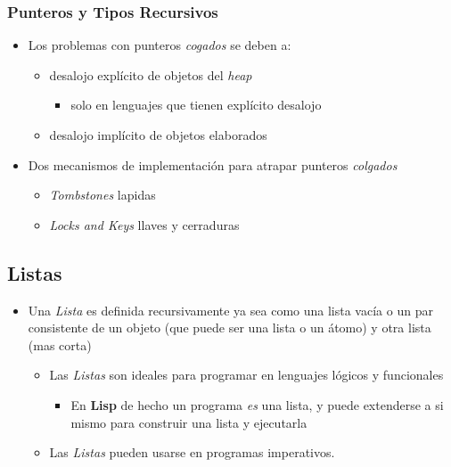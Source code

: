 \documentclass[11pt]{article}
\begin{document}
\subsubsection*{Punteros y Tipos Recursivos}
\label{sec:orgheadline45}
\begin{itemize}
\item Los problemas con punteros \emph{cogados} se deben a:
\begin{itemize}
\item desalojo explícito de objetos del \emph{heap}
\begin{itemize}
\item solo en lenguajes que tienen explícito desalojo
\end{itemize}
\item desalojo implícito de objetos elaborados
\end{itemize}
\item Dos mecanismos de implementación para atrapar punteros \emph{colgados}
\begin{itemize}
\item \emph{Tombstones} lapidas
\item \emph{Locks and Keys} llaves y cerraduras
\end{itemize}
\end{itemize}

\subsection*{Listas}
\label{sec:orgheadline47}
\begin{itemize}
\item Una \emph{Lista} es definida recursivamente ya sea como una lista vacía o
un par consistente de un objeto (que puede ser una lista o un átomo)
y otra lista (mas corta)
\begin{itemize}
\item Las \emph{Listas} son ideales para programar en lenguajes lógicos y funcionales
\begin{itemize}
\item En \textbf{Lisp} de hecho un programa \emph{es} una lista, y puede
extenderse a si mismo para construir una lista y ejecutarla
\end{itemize}
\item Las \emph{Listas} pueden usarse en programas imperativos.
\end{itemize}
\end{itemize}
\end{document}
